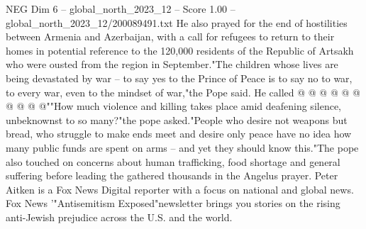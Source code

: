 \begin{textsample}{NEG Dim 6 – global\_north\_2023\_12 – Score 1.00 – global\_north\_2023\_12/200089491.txt}
He also prayed for the end of hostilities between Armenia and Azerbaijan, with a call for refugees to return to their homes in potential reference to the 120,000 residents of the Republic of Artsakh who were ousted from the region in September."The children whose lives are being devastated by war -- to say yes to the Prince of Peace is to say no to war, to every war, even to the mindset of war,"the Pope said.
He called @ @ @ @ @ @ @ @ @ @""How much violence and killing takes place amid deafening silence, unbeknownst to so many?"the pope asked."People who desire not weapons but bread, who struggle to make ends meet and desire only peace have no idea how many public funds are spent on arms -- and yet they should know this."The pope also touched on concerns about human trafficking, food shortage and general suffering before leading the gathered thousands in the Angelus prayer.
Peter Aitken is a Fox News Digital reporter with a focus on national and global news.
Fox News '"Antisemitism Exposed"newsletter brings you stories on the rising anti-Jewish prejudice across the U.S. and the world.

\end{textsample}

